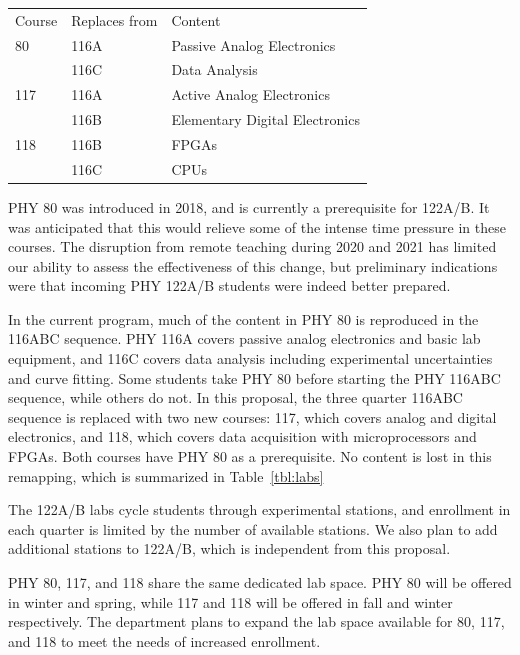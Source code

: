 \documentclass[12pt]{article}
\begin{document}
\noindent
\vskip 0.25cm
\begin{center}
\begin{tabular}{|lll|}
\hline
Course  & Replaces from & Content \\
80      & 116A        & Passive Analog Electronics \\
        & 116C        & Data Analysis \\
117     & 116A        & Active Analog Electronics \\
        & 116B        & Elementary Digital Electronics \\
118     & 116B        & FPGAs\\
        & 116C        & CPUs\\
\hline
\end{tabular}
\end{center}

PHY 80 was introduced in 2018, and is currently a prerequisite for
122A/B.  It was anticipated that this would relieve some of the
intense time pressure in these courses.  The disruption from remote
teaching during 2020 and 2021 has limited our ability to assess the
effectiveness of this change, but preliminary indications were that
incoming PHY 122A/B students were indeed better prepared.

In the current program, much of the content in PHY 80 is reproduced in
the 116ABC sequence. PHY 116A covers passive analog electronics and
basic lab equipment, and 116C covers data analysis including
experimental uncertainties and curve fitting.  Some students take PHY
80 before starting the PHY 116ABC sequence, while others do not. In
this proposal, the three quarter 116ABC sequence is replaced with two
new courses: 117, which covers analog and digital electronics, and
118, which covers data acquisition with microprocessors and FPGAs.
Both courses have PHY 80 as a prerequisite.  No content is lost in
this remapping, which is summarized in Table~\ref{tbl:labs}

The 122A/B labs cycle students through experimental stations, and
enrollment in each quarter is limited by the number of available
stations.  We also plan to add additional stations to 122A/B, which is independent
from this proposal.

PHY 80, 117, and 118 share the same dedicated lab space.  PHY 80 will
be offered in winter and spring, while 117 and 118 will be
offered in fall and winter respectively.  The department plans to
expand the lab space available for 80, 117, and 118 to meet the needs
of increased enrollment.
\end{document}
